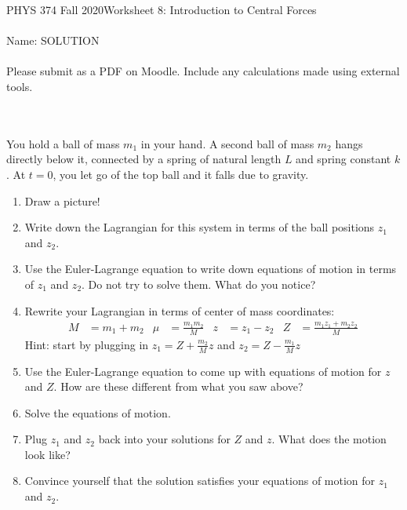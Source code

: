 \documentclass[12pt]{article}
\newcommand{\purple}[1]{{\color{purple} #1}}
\newcommand{\varz}{z}
\begin{document}
PHYS 374 Fall 2020\hfill Worksheet 8: Introduction to Central Forces\\
\\
Name: \purple{SOLUTION} \\
\\
Please submit as a PDF on Moodle. Include any calculations made using external tools.

\hrulefill
\\
\\
You hold a ball of mass $m_1$ in your hand. A second ball of mass $m_2$ hangs directly below it, connected by a spring of natural length $L$ and spring constant $k$. At $t=0$, you let go of the top ball and it falls due to gravity. 

\begin{enumerate}
    \item Draw a picture!
    \item Write down the Lagrangian for this system in terms of the ball positions $z_1$ and $z_2$. 
    \item Use the Euler-Lagrange equation to write down equations of motion in terms of $z_1$ and $z_2$. Do not try to solve them. What do you notice?
    \item Rewrite your Lagrangian in terms of center of mass coordinates:
    \begin{align*}
        M &= m_1 + m_2 & 
        \mu &= \frac{m_1 m_2}{M} &
        \varz &= z_1 - z_2 &
        Z &= \frac{m_1 z_1 + m_2 z_2}{M}
    \end{align*}
    Hint: start by plugging in $z_1 = Z + \tfrac{m_2}{M} \varz$ and $z_2 = Z - \tfrac{m_1}{M} \varz$
    \item Use the Euler-Lagrange equation to come up with equations of motion for $\varz$ and $Z$. How are these different from what you saw above?
    \item Solve the equations of motion.
    \item Plug $z_1$ and $z_2$ back into your solutions for $Z$ and $\varz$. What does the motion look like?
    \item Convince yourself that the solution satisfies your equations of motion for $z_1$ and $z_2$.
\end{enumerate}

\newpage
\end{document}

